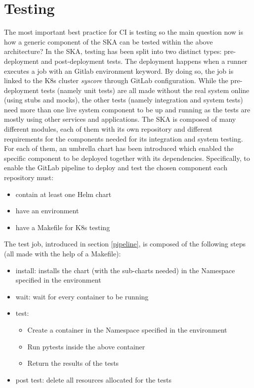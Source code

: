 \documentclass[a4paper,
               keeplastbox,   %
               ]{jacow}
\begin{document}
\section{Testing}
The most important best practice for CI is testing so the main question now is how a generic component of the SKA can be tested within the above architecture?
In the SKA, testing has been split into two distinct types: pre-deployment and post-deployment tests. The deployment happens when a runner executes a job with an Gitlab environment keyword. By doing so, the job is linked to the K8s cluster \textit{syscore} through GitLab configuration.
While the pre-deployment tests (namely unit tests) are all made without the real system online (using stubs and mocks), the other tests (namely integration and system tests) need more than one live system component to be up and running as the tests are mostly using other services and applications.
The SKA is composed of many different modules, each of them with its own repository and different requirements for the components needed for its integration and system testing. For each of them, an umbrella chart has been introduced which enabled the specific component to be deployed together with its dependencies.
Specifically, to enable the GitLab pipeline to deploy and test the chosen component each repository must:
\begin{itemize}
    \item contain at least one Helm chart
    \item have an environment
    \item have a Makefile for K8s testing
\end{itemize}

The test job, introduced in section \ref{pipeline}, is composed of the following steps (all made with the help of a Makefile):
\begin{itemize}
    \item install: installs the chart (with the sub-charts needed) in the Namespace specified in the environment
    \item wait: wait for every container to be running
    \item test:
    \begin{itemize}
        \item Create a container in the Namespace specified in the environment
        \item Run pytests inside the above container
        \item Return the results of the tests
    \end{itemize}
    \item post test: delete all resources allocated for the tests
\end{itemize}
\end{document}
